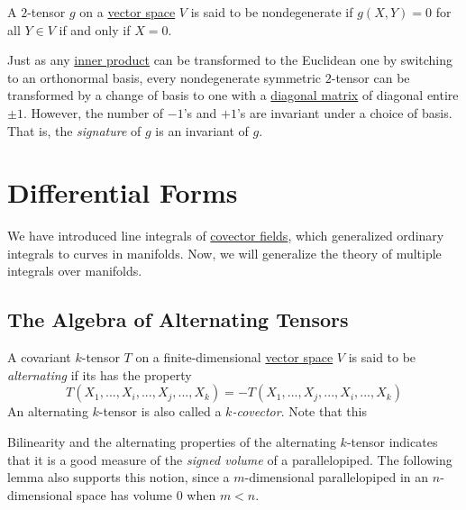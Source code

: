 \documentclass{article}
\newcounter{definition}[section]
\begin{document}
      \begin{definition}
        \label{def:nondegenerate-2-tensor}
      A $2$-tensor $g$ on a \hyperref[lin-def:vector-space]{vector space} $V$ is said to be nondegenerate if $g(X, Y) = 0$ for all $Y \in V$ if and only if $X = 0$. 
      \end{definition}

      Just as any \hyperref[lin-def:inner-product]{inner product} can be transformed to the Euclidean one by switching to an orthonormal basis, every nondegenerate  symmetric $2$-tensor can be transformed by a change of basis to one with a \hyperref[lin-def:diagonal-matrix]{diagonal matrix} of diagonal entire $\pm 1$. However, the number of $-1$'s and $+1$'s are invariant under a choice of basis. That is, the \textit{signature} of $g$ is an invariant of $g$. 

\section{Differential Forms}

  We have introduced line integrals of \hyperref[def:covector-field]{covector fields}, which generalized ordinary integrals to curves in manifolds. Now, we will generalize the theory of multiple integrals over manifolds. 

  \subsection{The Algebra of Alternating Tensors}

    \begin{definition}
      \label{def:alternating-tensor}
    A covariant $k$-tensor $T$ on a finite-dimensional \hyperref[lin-def:vector-space]{vector space} $V$ is said to be \textit{alternating} if its has the property
    \begin{equation}
      T(X_1, ..., X_i, ..., X_j, ..., X_k) = - T(X_1, ..., X_j, ..., X_i, ..., X_k)
    \end{equation}
    An alternating $k$-tensor is also called a \textit{$k$-covector}. Note that this 
    \end{definition}

    Bilinearity and the alternating properties of the alternating $k$-tensor indicates that it is a good measure of the \textit{signed volume} of a parallelopiped. The following lemma also supports this notion, since a $m$-dimensional parallelopiped in an $n$-dimensional space has volume $0$ when $m < n$. 
\end{document}

